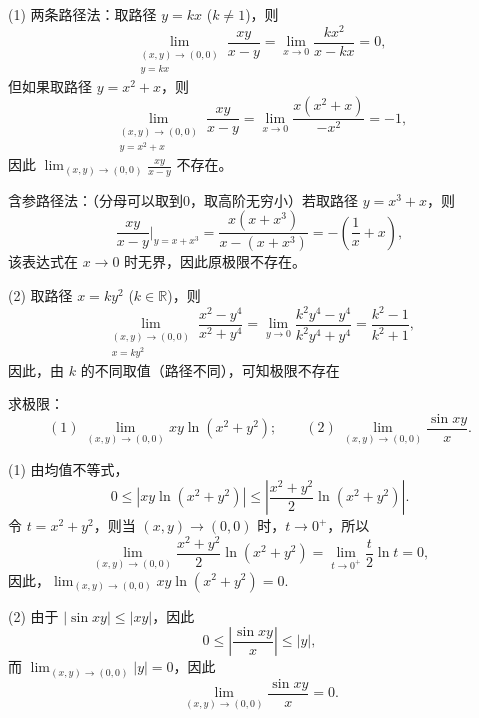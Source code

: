 \begin{solution}
    (1) 两条路径法：取路径 $y = kx$ ($k \neq 1$)，则
\[
\lim_{\substack{(x,y)\to(0,0) \\ y=kx}} \frac{xy}{x-y}
= \lim_{x\to 0} \frac{kx^2}{x - kx}
= 0,
\]
但如果取路径 $y = x^2 + x$，则
\[
\lim_{\substack{(x,y)\to(0,0) \\ y=x^2+x}} \frac{xy}{x-y}
= \lim_{x\to 0} \frac{x(x^2 + x)}{-x^2}
= -1,
\]
因此 $\displaystyle \lim_{(x,y)\to(0,0)} \frac{xy}{x-y}$ 不存在。

含参路径法：（分母可以取到0，取高阶无穷小）若取路径 $y = x^3 + x$，则
\[
\frac{xy}{x-y}\bigg|_{y=x+x^3}
=\frac{x(x+x^3)}{x-(x+x^3)}
=-\left(\frac{1}{x}+x\right),
\]
该表达式在 $x\to0$ 时无界，因此原极限不存在。

\medskip
(2) 取路径 $x = ky^2$ ($k \in \mathbb{R}$)，则
\[
\lim_{\substack{(x,y)\to(0,0) \\ x=ky^2}} \frac{x^2 - y^4}{x^2 + y^4}
= \lim_{y\to 0} \frac{k^2y^4 - y^4}{k^2y^4 + y^4}
= \frac{k^2 - 1}{k^2 + 1},
\]
因此，由 $k$ 的不同取值（路径不同），可知极限不存在
\end{solution}
\begin{problem}
    求极限：\[
(1)\ \lim_{(x,y)\to(0,0)} xy\ln(x^2 + y^2); \qquad
(2)\ \lim_{(x,y)\to(0,0)} \frac{\sin xy}{x}.
\]
\end{problem}
\begin{solution}
    (1) 由均值不等式，
\[
0 \le \left|xy\ln(x^2 + y^2)\right|
\le \left| \frac{x^2 + y^2}{2} \ln(x^2 + y^2) \right|.
\]
令 $t = x^2 + y^2$，则当 $(x,y)\to(0,0)$ 时，$t\to 0^+$，所以
\[
\lim_{(x,y)\to(0,0)} \frac{x^2 + y^2}{2}\ln(x^2 + y^2)
= \lim_{t\to 0^+} \frac{t}{2}\ln t = 0,
\]
因此，$\displaystyle \lim_{(x,y)\to(0,0)} xy\ln(x^2 + y^2) = 0$.

\medskip
(2) 由于 $|\sin xy| \le |xy|$，因此
\[
0 \le \left| \frac{\sin xy}{x} \right| \le |y|,
\]
而 $\displaystyle \lim_{(x,y)\to(0,0)} |y| = 0$，因此
\[
\lim_{(x,y)\to(0,0)} \frac{\sin xy}{x} = 0.
\]
\end{solution}
